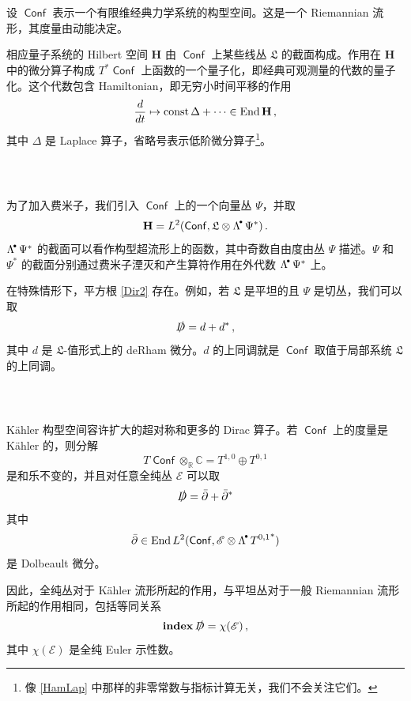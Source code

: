 \documentclass[12pt]{article}
\newcommand{\C}{\mathbb{C}}
\newcommand{\R}{\mathbb{R}}
\DeclareMathOperator{\End}{End}
\DeclareMathOperator{\Conf}{\mathsf{Conf}}
\DeclareMathOperator{\ind}{\mathbf{index}}
\newcommand{\cE}{\mathscr{E}}
\newcommand{\Dir}{\slashed D}
\newcommand{\frL}{\mathfrak{L}}
\newcommand{\Hlb}{\mathbf{H}}
\newcommand{\dbar}{\bar\partial}
\newcommand{\Ld}{{\Lambda}^{\!\raisebox{0.5mm}{$\scriptscriptstyle \bullet$}\,}}
\theoremstyle{definition}
\begin{document}
\subsubsection{\ }

设 $\Conf$ 表示一个有限维经典力学系统的构型空间。这是一个 Riemannian 流形，其度量由动能决定。

相应量子系统的 Hilbert 空间 $\Hlb$ 由 $\Conf$ 上某些线丛 $\frL$ 的截面构成。作用在 $\Hlb$ 中的微分算子构成 $T^*\!\Conf$ 上函数的一个量子化，即经典可观测量的代数的量子化。这个代数包含 Hamiltonian，即无穷小时间平移的作用
\begin{equation}
\frac{d}{dt}  \mapsto \textup{const} \, \Delta + \dots  \in \End \Hlb\,,
\label{HamLap}
\end{equation}
其中 $\Delta$ 是 Laplace 算子，省略号表示低阶微分算子\footnote{像 \eqref{HamLap} 中那样的非零常数与指标计算无关，我们不会关注它们。}。

\subsubsection{\ }

为了加入费米子，我们引入 $\Conf$ 上的一个向量丛 $\Psi$，并取
$$
\Hlb = L^2(\Conf,\frL \otimes \Ld \Psi^*)\,.
$$
$\Ld \Psi^*$ 的截面可以看作构型超流形上的函数，其中奇数自由度由丛 $\Psi$ 描述。$\Psi$ 和 $\Psi^*$ 的截面分别通过费米子湮灭和产生算符作用在外代数 $\Ld \Psi^*$ 上。

在特殊情形下，平方根 \eqref{Dir2} 存在。例如，若 $\frL$ 是平坦的且 $\Psi$ 是切丛，我们可以取
$$
\Dir = d + d^* \,,
$$
其中 $d$ 是 $\frL$-值形式上的 deRham 微分。$d$ 的上同调就是 $\Conf$ 取值于局部系统 $\frL$ 的上同调。

\subsubsection{\ }

Kähler 构型空间容许扩大的超对称和更多的 Dirac 算子。若 $\Conf$ 上的度量是 Kähler 的，则分解
$$
T\Conf \otimes_{\R} \C = T^{1,0} \oplus T^{0,1}
$$
是和乐不变的，并且对任意全纯丛 $\cE$ 可以取
$$
\Dir =  \dbar + \dbar^*
$$
其中
$$
\dbar \in \End L^2(\Conf,\cE \otimes \Ld {T^{0,1}}^*)
$$
是 Dolbeault 微分。

因此，全纯丛对于 Kähler 流形所起的作用，与平坦丛对于一般 Riemannian 流形所起的作用相同，包括等同关系
\begin{equation}
\ind \Dir= \chi(\cE)\,,
\label{indchiE}
\end{equation}
其中 $\chi(\cE)$ 是全纯 Euler 示性数。
\end{document}
